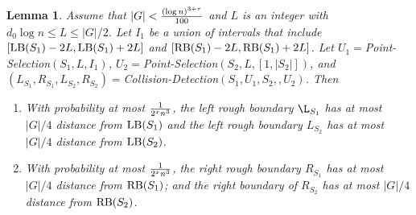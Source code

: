 \documentclass[11pt]{article}
\newtheorem{lemmafoo}[theoremfoo]{Lemma}
\newenvironment{lemma}{\pagebreak[1]\begin{lemmafoo}}{\end{lemmafoo}}
\newcommand{\LB}{{\rm LB}}
\newcommand{\RB}{{\rm RB}}
\newcommand{\thresholdL}{{(\log n)^{3+\tau}\over 100}}
\begin{document}
\begin{lemma}\label{collision-lemma2} Assume that   $|G|<\thresholdL$ and $L$ is an integer with $d_0\log n\le L\le |G|/2$.
Let $I_1$ be a union of intervals that include $[\LB(S_1)-2L,
\LB(S_1)+2L]$ and $[\RB(S_1)-2L, \RB(S_1)+2L]$. Let
$U_1=$Point-Selection$(S_1,L, I_1)$,
$U_2=$Point-Selection$(S_2,L,[1,|S_2|])$,   and
  $(L_{S_1},R_{S_1},L_{S_2},R_{S_2})=$Collision-Detection$(S_1,U_1,S_2,,U_2)$.
 Then
\begin{enumerate}
\item
With probability at most ${1\over 2^{x}n^{3}}$, the left rough
boundary $\L_{S_1}$ has at most $|G|/4$ distance from $\LB(S_1)$ and
the left rough boundary $L_{S_2}$ has at most $|G|/4$ distance from
$\LB(S_2)$.

\item
 With probability at most ${1\over 2^{x}n^{3}}$, the right rough boundary $R_{S_1}$ has at most
$|G|/4$ distance from $\RB(S_1)$; and the right boundary of
$R_{S_2}$ has at most $|G|/4$ distance from $\RB(S_2)$.
\end{enumerate}
\end{lemma}
\end{document}
